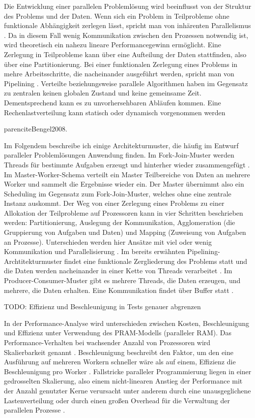 \documentclass[a4paper,12pt,twoside]{article}
\begin{document}
Die Entwicklung einer parallelen Problemlösung wird beeinflusst von der Struktur des Problems und der Daten. Wenn sich ein Problem in Teilprobleme ohne funktionale Abhängigkeit zerlegen lässt, spricht man von inhärenten Parallelismus \parencite[S. 321f]{Bengel2008}. Da in diesem Fall wenig Kommunikation zwischen den Prozessen notwendig ist, wird theoretisch ein nahezu lineare Performancegewinn ermöglicht. Eine Zerlegung in Teilprobleme kann über eine Aufteilung der Daten stattfinden, also über eine Partitionierung. Bei einer funktionalen Zerlegung eines Problems in mehre Arbeitsschritte, die nacheinander ausgeführt werden, spricht man von Pipelining \parencite[S. 324]{Bengel2008}. Verteilte beziehungsweise parallele Algorithmen haben im Gegensatz zu zentralen keinen globalen Zustand und keine gemeinsame Zeit. Dementsprechend kann es zu unvorhersehbaren Abläufen kommen. Eine Rechenlastverteilung kann statisch oder dynamisch vorgenommen werden {parencite{Bengel2008}.

Im Folgendem beschreibe ich einige Architekturmuster, die häufig im Entwurf paralleler Problemlösungen Anwendung finden. Im Fork-Join-Muster werden Threads für bestimmte Aufgaben erzeugt und hinterher wieder zusammengefügt \parencite[S. 109]{Rauber2013}. Im Master-Worker-Schema verteilt ein Master Teilbereiche von Daten an mehrere Worker und sammelt die Ergebnisse wieder ein. Der Master übernimmt also ein Scheduling im Gegensatz zum Fork-Join-Muster, welches ohne eine zentrale Instanz auskommt. Der Weg von einer Zerlegung eines Problems zu einer Allokation der Teilprobleme auf Prozessoren kann in vier Schritten beschrieben werden: Partitionierung, Auslegung der Kommunikation, Agglomeration (die Gruppierung von Aufgaben und Daten) und Mapping (Zuweisung von Aufgaben an Prozesse). Unterschieden werden hier Ansätze mit viel oder wenig Kommunikation und Parallelisierung \parencite[S. 326f]{Bengel2008}. Im bereits erwähnten Pipelining-Archtitekturmuster findet eine funktionale Zergliederung des Problems statt und die Daten werden nacheinander in einer Kette von Threads verarbeitet \parencite[S. 111]{Rauber2013}. Im Producer-Consumer-Muster gibt es mehrere Threads, die Daten erzeugen, und mehrere, die Daten erhalten. Eine Kommunikation findet über Buffer statt \parencite[S. 112]{Rauber2013}.

TODO: Effizienz und Beschleunigung in Tests genauer abgrenzen

In der Performance-Analyse wird unterschieden zwischen Kosten, Beschleunigung und Effizienz unter Verwendung des PRAM-Modells (paralleler RAM). Das Performance-Verhalten bei wachsender Anzahl von Prozessoren wird Skalierbarkeit genannt \parencite{Rauber2013}. Beschleunigung beschreibt den Faktor, um den eine Ausführung auf mehreren Workern schneller wäre als auf einem, Effizienz die Beschleunigung pro Worker \parencite[S. 56]{McCool2012}. Fallstricke paralleler Programmierung liegen in einer gedrosselten Skalierung, also einem nicht-linearen Anstieg der Performance mit der Anzahl genutzter Kerne verursacht unter anderem durch eine unausgeglichene Lastenverteilung oder durch einen großen Overhead für die Verwaltung der parallelen Prozesse \parencite[S. 74]{McCool2012}.

}
\end{document}
